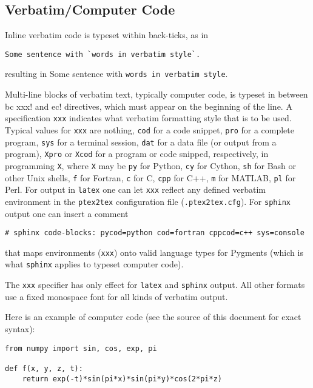 \documentclass[%
oneside,                 %
final,                   %
10pt]{article}
\begin{document}
\subsection{Verbatim/Computer Code}

Inline verbatim code is typeset within back-ticks, as in
\begin{Verbatim}[numbers=none,fontsize=\fontsize{9pt}{9pt},baselinestretch=0.85,xleftmargin=0mm]
Some sentence with `words in verbatim style`.
\end{Verbatim}
resulting in Some sentence with \Verb!words in verbatim style!.

Multi-line blocks of verbatim text, typically computer code, is typeset
in between \Verb!!bc xxx! and \Verb!!ec! directives, which must appear on the
beginning of the line. A specification \Verb!xxx! indicates what verbatim
formatting style that is to be used. Typical values for \Verb!xxx! are
nothing, \Verb!cod! for a code snippet, \Verb!pro! for a complete program,
\Verb!sys! for a terminal session, \Verb!dat! for a data file (or output from a
program),
\Verb!Xpro! or \Verb!Xcod! for a program or code snipped, respectively,
in programming \Verb!X!, where \Verb!X! may be \Verb!py! for Python,
\Verb!cy! for Cython, \Verb!sh! for Bash or other Unix shells,
\Verb!f! for Fortran, \Verb!c! for C, \Verb!cpp! for C++, \Verb!m! for MATLAB,
\Verb!pl! for Perl. For output in \Verb!latex! one can let \Verb!xxx! reflect any
defined verbatim environment in the \Verb!ptex2tex! configuration file
(\Verb!.ptex2tex.cfg!). For \Verb!sphinx! output one can insert a comment
\begin{Verbatim}[numbers=none,fontsize=\fontsize{9pt}{9pt},baselinestretch=0.85,xleftmargin=0mm]
# sphinx code-blocks: pycod=python cod=fortran cppcod=c++ sys=console
\end{Verbatim}
that maps environments (\Verb!xxx!) onto valid language types for
Pygments (which is what \Verb!sphinx! applies to typeset computer code).

The \Verb!xxx! specifier has only effect for \Verb!latex! and
\Verb!sphinx! output. All other formats use a fixed monospace font for all
kinds of verbatim output.

Here is an example of computer code (see the source of this document
for exact syntax):

\begin{Verbatim}[numbers=none,fontsize=\fontsize{9pt}{9pt},baselinestretch=0.85,xleftmargin=0mm]
from numpy import sin, cos, exp, pi

def f(x, y, z, t):
    return exp(-t)*sin(pi*x)*sin(pi*y)*cos(2*pi*z)
\end{Verbatim}
\end{document}
